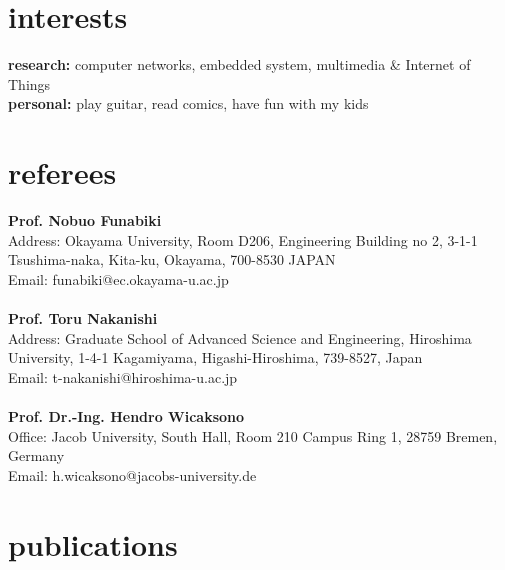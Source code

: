 \documentclass[style=verbose,maxnames=99,sorting=ydnt,style=verbose,maxnames=99,sorting=ydnt,backend=biber]{friggeri-cv} %
\begin{document}
\section{interests}

\textbf{research:} computer networks, embedded system, multimedia \& Internet of Things\\ \textbf{personal:} play guitar, read comics, have fun with my kids

\section{referees}

\textbf{Prof. Nobuo Funabiki}\\
Address: Okayama University, Room D206, Engineering Building no 2, 3-1-1 Tsushima-naka, Kita-ku, Okayama, 700-8530 JAPAN\\
Email: funabiki@ec.okayama-u.ac.jp\\
\\
\textbf{Prof. Toru Nakanishi}\\
Address: Graduate School of Advanced Science and Engineering, Hiroshima University, 1-4-1 Kagamiyama, Higashi-Hiroshima, 739-8527, Japan\\
Email: t-nakanishi@hiroshima-u.ac.jp\\
\\
\textbf{Prof. Dr.-Ing. Hendro Wicaksono}\\
Office: Jacob University, South Hall, Room 210 Campus Ring 1, 28759 Bremen, Germany\\
Email: h.wicaksono@jacobs-university.de


\pagebreak

\section{publications}




\nocite{*}

\end{document}
